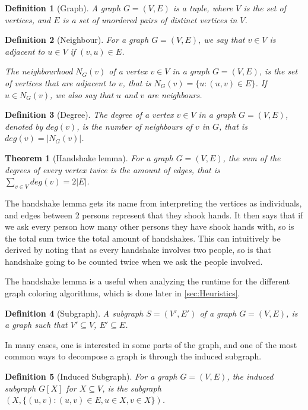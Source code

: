 \documentclass[a4paper]{article}
\newtheorem{theorem}{Theorem}[section]
\newtheorem{definition}{Definition}[section]
\begin{document}
\begin{definition}[Graph]
    A graph $G = (V,E)$ is a tuple, where $V$ is the set of vertices, and $E$ is
    a set of unordered pairs of distinct vertices in $V$.
\end{definition}
\begin{definition}[Neighbour]
    For a graph $G = (V,E)$, we say that $v \in V$ is adjacent to 
    $u \in V$ if $(v,u) \in E$. 

    The neighbourhood $N_G(v)$ of a vertex $v \in V$ in a graph $G = (V,E)$,
    is the set of vertices that are adjacent to $v$, that is 
    $N_G(v) = \{u : (u,v) \in E \}$. If $u \in N_G(v)$, we also say
    that $u$ and $v$ are neighbours.
\end{definition}
\begin{definition}[Degree]
    The degree of a vertex $v \in V$ in a graph $G = (V,E)$, denoted by 
    $deg(v)$, is the number of neighbours of $v$ in $G$, that is 
    $deg(v) = |N_G(v)|$.
\end{definition}
\begin{theorem}[Handshake lemma]{\cite{GraphBasics}}
    For a graph $G = (V,E)$, the sum of the degrees of every vertex twice is
    the amount of edges, that is $\sum_{v \in V} deg(v) = 2|E|$.
\end{theorem}

The handshake lemma gets its name from interpreting the vertices as
individuals, and edges between 2 persons represent that they shook hands. It 
then says that if we ask every person how many other persons they have shook
hands with, so is the total sum twice the total amount of handshakes. This can
intuitively be derived by noting that as every handshake involves two people, so
is that handshake going to be counted twice when we ask the people involved.

The handshake lemma is a useful when analyzing the runtime for 
the different graph coloring algorithms, which is done later in
\autoref{sec:Heuristics}.


\begin{definition}[Subgraph]
    A subgraph $S = (V',E')$ of a graph $G = (V,E)$, is a graph such that
    $V' \subseteq V$, $E' \subseteq E$.
\end{definition}
In many cases, one is interested in some parts of the graph, and one of the
most common ways to decompose a graph is through the induced subgraph.
\begin{definition}[Induced Subgraph]
    For a graph $G = (V,E)$, the induced subgraph $G[X]$ for $X \subseteq V$, is
    the subgraph $(X,\{(u,v) : (u,v) \in E, u \in X,v \in X\})$. 
\end{definition}
\end{document}
